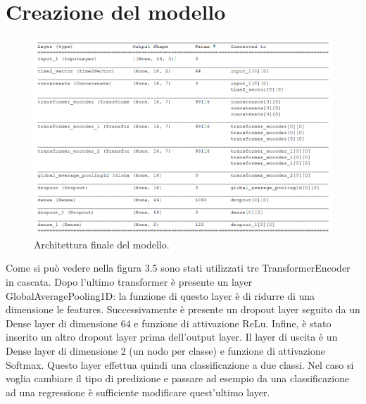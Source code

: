 \documentclass[12pt,a4paper,twoside,openright]{book}
\begin{document}
\section{Creazione del modello}
\begin{figure}[H]
\centering
\includegraphics[width=1\textwidth]{images/model.png}
\caption{Architettura finale del modello.}
\label{fig:rapp_file}
\end{figure}
Come si può vedere nella figura 3.5 sono stati utilizzati tre TransformerEncoder in cascata.
Dopo l’ultimo transformer è presente un layer GlobalAveragePooling1D: la funzione di questo layer è di ridurre di una dimensione le features.
Successivamente è presente un dropout layer seguito da un Dense layer di dimensione 64 e funzione di attivazione ReLu.
Infine, è stato inserito un altro dropout layer prima dell’output layer.
Il layer di uscita è un Dense layer di dimensione 2 (un nodo per classe) e funzione di attivazione Softmax. Questo layer effettua quindi una classificazione a due classi. Nel caso si voglia cambiare il tipo di predizione e passare ad esempio da una classificazione ad una regressione è sufficiente modificare quest'ultimo layer.
\end{document}
